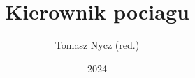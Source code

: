 
\title[Przygotowanie zawodowe, Staż stanowiskowy, Szkolenie teoretyczne]{Kierownik pociagu}
\author{Tomasz Nycz (red.)}
\date{2024}

